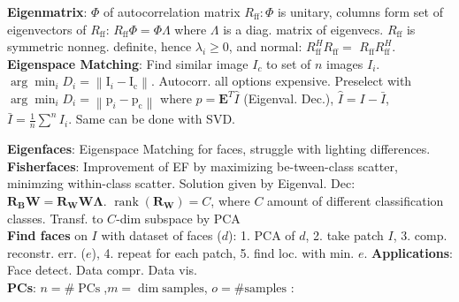 \textbf{Eigenmatrix}: $\Phi$ of autocorrelation matrix $R_{\mathrm{ff}}: \Phi$ is unitary, columns form set of eigenvectors of $R_{\mathrm{ff}}$: $R_{\mathrm{ff}} \Phi=\Phi \Lambda$ where $\Lambda$ is a diag. matrix of eigenvecs. $R_{\mathrm{ff}}$ is symmetric nonneg. definite, hence $\lambda_i \geq 0$, and normal: $R_{\mathrm{ff}}^H R_{\mathrm{ff}}=$ $R_{\mathrm{ff}} R_{\mathrm{ff}}^H$.\\

\textbf{Eigenspace Matching}: Find similar image $I_{c}$ to set of $n$ images $I_i$.${\arg \min_i } D_i=\left\|\mathrm{I}_i-\mathrm{I_c}\right\|$. Autocorr. all options expensive. Preselect with ${\arg \min_i } D_i=\left\|\mathrm{p}_i-\mathrm{p_c}\right\|$ where $p=\mathbf{E}^{T}\hat{I}$ (Eigenval. Dec.), $\hat{I}= I - \bar{I}$, $\bar{I}=\frac{1}{n}\sum^{n} I_i$. Same can be done with SVD.

\textbf{Eigenfaces}: Eigenspace Matching for faces, struggle with lighting differences. \\
\textbf{Fisherfaces}: Improvement of EF by maximizing be-tween-class scatter, minimzing within-class scatter. Solution given by Eigenval. Dec: $\mathbf{R_B W}=\mathbf{R_W W \Lambda}$. $\operatorname{rank}(\mathbf{R_W})=C$, where $C$ amount of different classification classes. Transf. to $C$-dim subspace by PCA  \\
\textbf{Find faces} on $I$ with dataset of faces ($d$): 1. PCA of $d$, 2. take patch $I$, 3. comp. reconstr. err. ($e$), 4. repeat for each patch, 5. find loc. with min. $e$.
\textbf{Applications}: Face detect. Data compr. Data vis.\\
\textbf{PCs}: $n=\# \operatorname{PCs}$,$m= \operatorname{dim} \text{samples}$, $o= \# \text{samples}$  :

